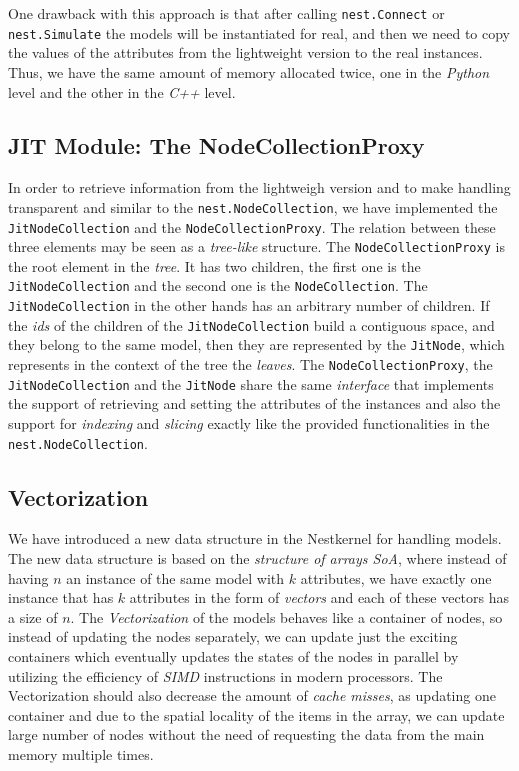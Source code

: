 One drawback with this approach is that after calling \texttt{nest.Connect} or \texttt{nest.Simulate} the models will be instantiated for real, and then we need to copy the values of the attributes from the lightweight version to the real instances. Thus, we have the same amount of memory allocated twice, one in the \emph{Python} level and the other in the \emph{C++} level.

\subsection*{JIT Module: The NodeCollectionProxy}

In order to retrieve information from the lightweigh version and to make handling transparent and similar to the \texttt{nest.NodeCollection}, we have implemented the \texttt{JitNodeCollection} and the \texttt{NodeCollectionProxy}. The relation between these three elements may be seen as a \emph{tree-like} structure. The \texttt{NodeCollectionProxy} is the root element in the \emph{tree}. It has two children, the first one is the \texttt{JitNodeCollection} and the second one is the \texttt{NodeCollection}. The \texttt{JitNodeCollection} in the other hands has an arbitrary  number of children. If the \emph{ids} of the children of the \texttt{JitNodeCollection} build a contiguous space, and they belong to the same model, then they are represented by the \texttt{JitNode}, which represents in the context of the tree the \emph{leaves}. The \texttt{NodeCollectionProxy}, the \texttt{JitNodeCollection} and the \texttt{JitNode} share the same \emph{interface} that implements the support of retrieving and setting the attributes of the instances and also the support for \emph{indexing} and \emph{slicing} exactly like the provided functionalities in the \texttt{nest.NodeCollection}.

\subsection*{Vectorization}

We have introduced a new data structure in the Nestkernel for handling models. The new data structure is based on the \emph{structure of arrays SoA}, where instead of having $n$ an instance of the same model with $k$ attributes, we have exactly one instance  that has $k$ attributes in the form of \emph{vectors} and each of these vectors has a size of $n$. The \emph{Vectorization} of the models behaves like a container of nodes, so instead of updating the nodes separately, we can update just the exciting containers which eventually updates the states of the nodes in parallel by utilizing the efficiency of \emph{SIMD} instructions in modern processors. The Vectorization should also decrease the amount of \emph{cache misses}, as  updating one container and due to the spatial locality of the items in the array, we can update large number of nodes without the need of requesting the data from the main memory multiple times.


